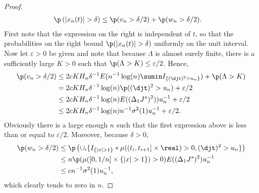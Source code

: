 \begin{proof}
    \begin{align}
     \p &\left(  \vert x_n (t) \vert  > \delta\right) \le \p(v_n > \delta/2) + \p(w_n > \delta/2) \notag. 
      \label{}
    \end{align}
  First note that the expression on the right is independent of $t$, so that the probabilities on the right bound $\p(\vert x_n(t) \vert > \delta) $ uniformly on the unit interval. Now let  $\varepsilon > 0$ be given and note that because  $\Lambda$ is almost surely finite,   there is a sufficiently large $K > 0$ such that $\p(\Lambda > K) \le \varepsilon/2$. Hence,  \begin{align} \p(v_n > \delta /2) & \le 2cKH_n\delta^{-1}E(n^{-1} \log(n) \sumin I_{\{(\djt)^2 > u_n\}}) + \p(\Lambda > K) \notag  \\ & = 2cK H_n\delta^{-1}\log(n) \p( (\djt)^2 > u_n)  + \varepsilon/2 \notag \\ &\le  2cK H_n\delta^{-1}\log(n) E((\Delta_1 J^s)^2))u_n^{-1}   + \varepsilon/2 \notag \\ &\le 2cKH_n\delta^{-1} \log(n) n^{-1}\sigma^2(1)u_n^{-1} +  \varepsilon/2\label{eq:asabove}. \end{align} Obviously there is a large enough $n$ such that the first expression above is less than or equal to $\varepsilon/2$.   Moreover, because $\delta >  0$,  \begin{align} \p(w_n > \delta/2) & \le \p\left(\cup_i\{I_{\{\vert x \vert > 1\}}\ast \mu( (t_i, t_{i + 1}] \times \real) > 0   , (\djt)^2 > u_n\}\right) \notag \\ & \le n \p(\mu( [0, 1/n] \times \{\vert x \vert > 1\}) > 0 ) E( (\Delta_1 J^s)^2) u_n^{-1} \notag \\ & \le c n^{-1} \sigma^2(1) u_n^{-1}\notag,\end{align} which clearly tends to zero in $n$. 


\end{proof}
